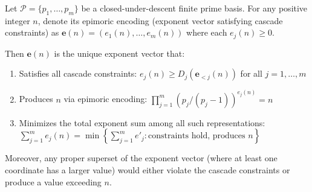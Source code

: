\begin{theorem}
\label{thm:minimal-representation}

Let $\mathcal{P} = \{p_1, \ldots, p_m\}$ be a closed-under-descent finite prime basis. For any positive integer $n$, denote its epimoric encoding (exponent vector satisfying cascade constraints) as $\mathbf{e}(n) = (e_1(n), \ldots, e_m(n))$ where each $e_j(n) \geq 0$.

Then $\mathbf{e}(n)$ is the unique exponent vector that:
\begin{enumerate}
\item Satisfies all cascade constraints: $e_j(n) \geq D_j(\mathbf{e}_{<j}(n))$ for all $j = 1, \ldots, m$
\item Produces $n$ via epimoric encoding: $\prod_{j=1}^m (p_j/(p_j-1))^{e_j(n)} = n$
\item Minimizes the total exponent sum among all such representations: $\sum_{j=1}^m e_j(n) = \min \left\{\sum_{j=1}^m e'_j : \text{constraints hold, produces } n\right\}$
\end{enumerate}

Moreover, any proper superset of the exponent vector (where at least one coordinate has a larger value) would either violate the cascade constraints or produce a value exceeding $n$.

\end{theorem}

